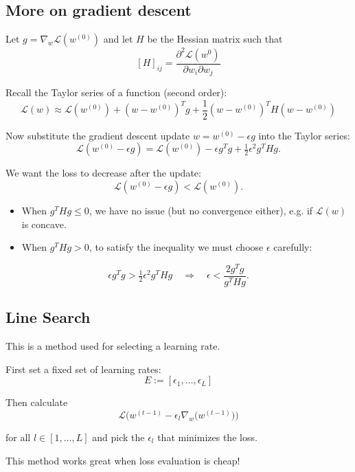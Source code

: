 \documentclass[11pt]{article}
\begin{document}
\subsection*{More on gradient descent}

Let $g = \nabla_w \mathcal{L}(w^{(0)})$ and let $H$ be the Hessian matrix such that
\[
	[H]_{ij} = \frac{\partial^2 \mathcal{L}(w^{0})}{\partial w_i \partial w_j}
\]

Recall the Taylor series of a function (second order):
\[
	\mathcal{L}(w) \approx \mathcal{L}(w^{(0)}) + (w - w^{(0)})^T g
	+ \frac{1}{2}(w - w^{(0)})^T H (w - w^{(0)})
\]

Now substitute the gradient descent update $w = w^{(0)} - \epsilon g$
into the Taylor series:
\[
	\mathcal{L}(w^{(0)} - \epsilon g)
	= \mathcal{L}(w^{(0)}) - \epsilon g^T g
	+ \tfrac{1}{2}\epsilon^2 g^T H g.
\]

We want the loss to decrease after the update:
\[
	\mathcal{L}(w^{(0)} - \epsilon g) < \mathcal{L}(w^{(0)}).
\]

\begin{itemize}
	\item When \( g^T H g \leq 0 \), we have no issue (but no convergence either), e.g. if \(\mathcal{L}(w)\) is concave.
	\item When \( g^T H g > 0 \), to satisfy the inequality we must choose \(\epsilon\) carefully:
\end{itemize}

\[
	\epsilon g^T g > \tfrac{1}{2}\epsilon^2 g^T H g
	\quad \Rightarrow \quad
	\epsilon < \frac{2 g^T g}{g^T H g}.
\]


\subsection*{Line Search}
This is a method used for selecting a learning rate.

\medskip

First set a fixed set of learning rates:
\[
	E := [\epsilon_1, \ldots, \epsilon_L]
\]

Then calculate
\[
	\mathcal{L}\!\Big(w^{(t-1)} - \epsilon_l \nabla_w \big(w^{(t-1)}\big)\Big)
\]

for all $l \in [1, \ldots, L]$ and pick the $\epsilon_l$ that minimizes the loss.

\medskip

This method works great when loss evaluation is cheap!
\end{document}
